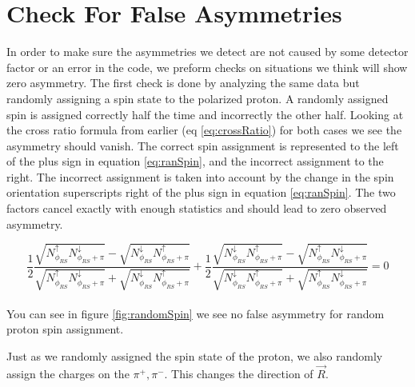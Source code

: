 \documentclass[abstract = on,listof=totoc, bibliography=totoc]{scrreprt}
\newcommand{\pip}{\pi^+}
\newcommand{\pim}{\pi^-}
\begin{document}
\section{Check For False Asymmetries}
In order to make sure the asymmetries we detect are not caused by some detector factor or an error in the code, we preform checks on situations we think will show zero asymmetry. The first check is done by analyzing the same data but randomly assigning a spin state to the polarized proton. A randomly assigned spin is assigned correctly half the time and incorrectly the other half. Looking at the cross ratio formula from earlier (eq \ref{eq:crossRatio}) for both cases we see the asymmetry should vanish. The correct spin assignment is represented to the left of the plus sign in equation \ref{eq:ranSpin}, and the incorrect assignment to the right. The incorrect assignment is taken into account by the change in the spin orientation superscripts right of the plus sign in equation \ref{eq:ranSpin}. The two factors cancel exactly with enough statistics and should lead to zero observed asymmetry. 

    

 
\begin{equation}
\label{eq:ranSpin}
\frac{1}{2}\frac{\sqrt{N^\uparrow_{\phi_{RS}}N^\downarrow_{\phi_{RS}+\pi}} - \sqrt{N^\downarrow_{\phi_{RS}}N^\uparrow_{\phi_{RS}+\pi}}}{\sqrt{N^\uparrow_{\phi_{RS}}N^\downarrow_{\phi_{RS}+\pi}} + \sqrt{N^\downarrow_{\phi_{RS}}N^\uparrow_{\phi_{RS}+\pi}}}
+
\frac{1}{2}\frac{\sqrt{N^\downarrow_{\phi_{RS}}N^\uparrow_{\phi_{RS}+\pi}} - \sqrt{N^\uparrow_{\phi_{RS}}N^\downarrow_{\phi_{RS}+\pi}}}{\sqrt{N^\downarrow_{\phi_{RS}}N^\uparrow_{\phi_{RS}+\pi}} + \sqrt{N^\uparrow_{\phi_{RS}}N^\downarrow_{\phi_{RS}+\pi}}} = 0
\end{equation}\\
%
You can see in figure \ref{fig:randomSpin} we see no false asymmetry for random proton spin assignment. 

Just as we randomly assigned the spin state of the proton, we also randomly assign the charges on the $\pip,\pim$. This changes the direction of $\vec{R}$. 
\end{document}
